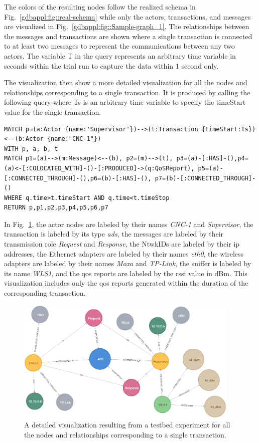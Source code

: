 The colors of the resulting nodes follow the realized schema in Fig.~\ref{gdbappl:fig::real-schema} while only the actors, transactions, and messages are visualized in Fig.~\ref{gdbappl:fig::Sample-graph_1}. The relationships between the messages and transactions are shown where a single transaction is connected to at least two messages to represent the communications between any two actors. The variable T in the query represents an arbitrary time variable in seconds within the trial run to capture the data within 1 second only.

The visualization then show a more detailed visualization for all the nodes and relationships corresponding to a single transaction. It is produced by calling the following query where Ts is an arbitrary time variable to specify the timeStart value for the single transaction. 

\begin{lstlisting}
MATCH p=(a:Actor {name:'Supervisor'})-->(t:Transaction {timeStart:Ts})<--(b:Actor {name:"CNC-1"})
WITH p, a, b, t
MATCH p1=(a)-->(m:Message)<--(b), p2=(m)-->(t), p3=(a)-[:HAS]-(),p4=(a)<-[:COLOCATED_WITH]-()-[:PRODUCED]->(q:QoSReport), p5=(a)-[:CONNECTED_THROUGH]-(),p6=(b)-[:HAS]-(), p7=(b)-[:CONNECTED_THROUGH]-()
WHERE q.time>t.timeStart AND q.time<t.timeStop
RETURN p,p1,p2,p3,p4,p5,p6,p7
\end{lstlisting}

In Fig.~\ref{gdbappl:fig::Sample-graph_2}, the actor nodes are labeled by their names \textit{CNC-1} and \textit{Supervisor}, the transaction is labeled by its type \textit{\gls{ads}}, the messages are labeled by their transmission role \textit{Request} and \textit{Response}, the NtwkIDs are labeled by their \gls{ip} addresses, the Ethernet adapters are labeled by their names \textit{eth0}, the wireless adapters are labeled by their names \textit{Moxa} and \textit{TP-Link}, the sniffer is labeled by its name \textit{WLS1}, and the \gls{qos} reports are labeled by the \gls{rssi} value in dBm. This visualization includes only the \gls{qos} reports generated within the duration of the corresponding transaction.   

\begin{figure}[!ht]
    \centering
    \includegraphics[width=0.95\textwidth]{./chapter-gdb-appl/figures/database/graph_Single_trans.png}
    \caption{A detailed visualization resulting from a testbed experiment for all the nodes and relationships corresponding to a single transaction. }
    \label{gdbappl:fig::Sample-graph_2}
\end{figure}

